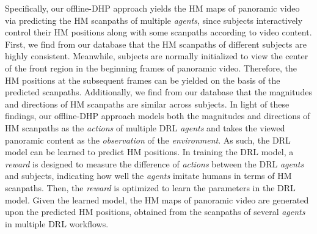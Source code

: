 \documentclass[10pt,journal,compsoc]{IEEEtran}
\begin{document}
Specifically, our offline-DHP approach yields the HM maps of panoramic video via predicting the HM scanpaths of multiple \textit{agents}, since subjects interactively control their HM positions along with some scanpaths according to video content.
First, we find from our database that the HM scanpaths of different subjects are highly consistent.
Meanwhile, subjects are normally initialized to view the center of the front region in the beginning frames of panoramic video.
Therefore, the HM positions at the subsequent frames can be yielded on the basis of the predicted scanpaths.
Additionally, we find from our database that the magnitudes and directions of HM scanpaths are similar across subjects.
In light of these findings, our offline-DHP approach models both the magnitudes and directions of HM scanpaths as the \textit{actions} of multiple DRL \textit{agents} and takes the viewed panoramic content as the \textit{observation} of the \textit{environment}.
As such, the DRL model can be learned to predict HM positions.
In training the DRL model, a \textit{reward} is designed to measure the difference of \textit{actions}  between the DRL \textit{agents} and subjects, indicating how well the \textit{agents} imitate humans in terms of HM scanpaths.
Then, the \textit{reward} is optimized to learn the parameters in the DRL model.
Given the learned model, the HM maps of panoramic video are generated upon the predicted HM positions, obtained from the scanpaths of several \textit{agents} in multiple DRL workflows.

\end{document}
